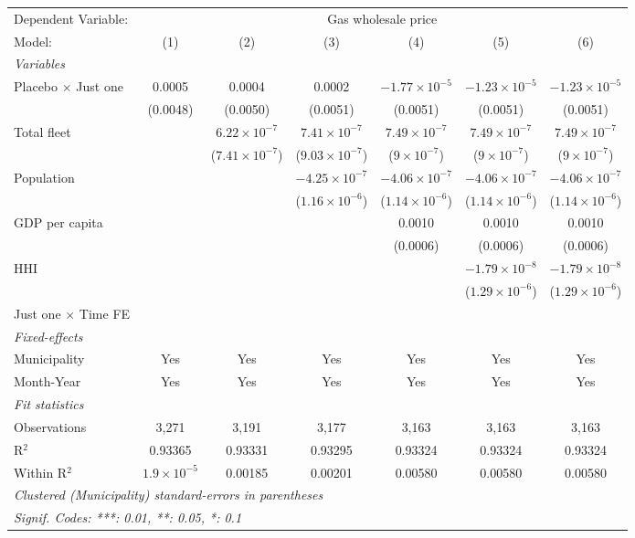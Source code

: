 \documentclass[
]{article}
\begin{document}
\begin{tabular}{lcccccc}
\tabularnewline\midrule\midrule
Dependent Variable:&\multicolumn{6}{c}{Gas wholesale price}\\
Model:&(1) & (2) & (3) & (4) & (5) & (6)\\
\midrule \emph{Variables}&   &   &   &   &   &  \\
Placebo $\times $ Just one & 0.0005 & 0.0004 & 0.0002 & $-1.77\times 10^{-5}$ & $-1.23\times 10^{-5}$ & $-1.23\times 10^{-5}$\\
  &(0.0048) & (0.0050) & (0.0051) & (0.0051) & (0.0051) & (0.0051)\\
Total fleet &    & $6.22\times 10^{-7}$ & $7.41\times 10^{-7}$ & $7.49\times 10^{-7}$ & $7.49\times 10^{-7}$ & $7.49\times 10^{-7}$\\
  &   & ($7.41\times 10^{-7}$) & ($9.03\times 10^{-7}$) & ($9\times 10^{-7}$) & ($9\times 10^{-7}$) & ($9\times 10^{-7}$)\\
Population &    &    & $-4.25\times 10^{-7}$ & $-4.06\times 10^{-7}$ & $-4.06\times 10^{-7}$ & $-4.06\times 10^{-7}$\\
  &   &    & ($1.16\times 10^{-6}$) & ($1.14\times 10^{-6}$) & ($1.14\times 10^{-6}$) & ($1.14\times 10^{-6}$)\\
GDP per capita &    &    &    & 0.0010 & 0.0010 & 0.0010\\
  &   &    &    & (0.0006) & (0.0006) & (0.0006)\\
HHI &    &    &    &    & $-1.79\times 10^{-8}$ & $-1.79\times 10^{-8}$\\
  &   &    &    &    & ($1.29\times 10^{-6}$) & ($1.29\times 10^{-6}$)\\
Just one $\times$ Time FE &  &  &  &  &  & \\
\midrule \emph{Fixed-effects}&   &   &   &   &   &  \\
Municipality & Yes & Yes & Yes & Yes & Yes & Yes\\
Month-Year & Yes & Yes & Yes & Yes & Yes & Yes\\
\midrule \emph{Fit statistics}&  & & & & & \\
Observations & 3,271&3,191&3,177&3,163&3,163&3,163\\
R$^2$ & 0.93365&0.93331&0.93295&0.93324&0.93324&0.93324\\
Within R$^2$ & $1.9\times 10^{-5}$&0.00185&0.00201&0.00580&0.00580&0.00580\\
\midrule\midrule\multicolumn{7}{l}{\emph{Clustered (Municipality) standard-errors in parentheses}}\\
\multicolumn{7}{l}{\emph{Signif. Codes: ***: 0.01, **: 0.05, *: 0.1}}\\
\end{tabular}
\end{document}
